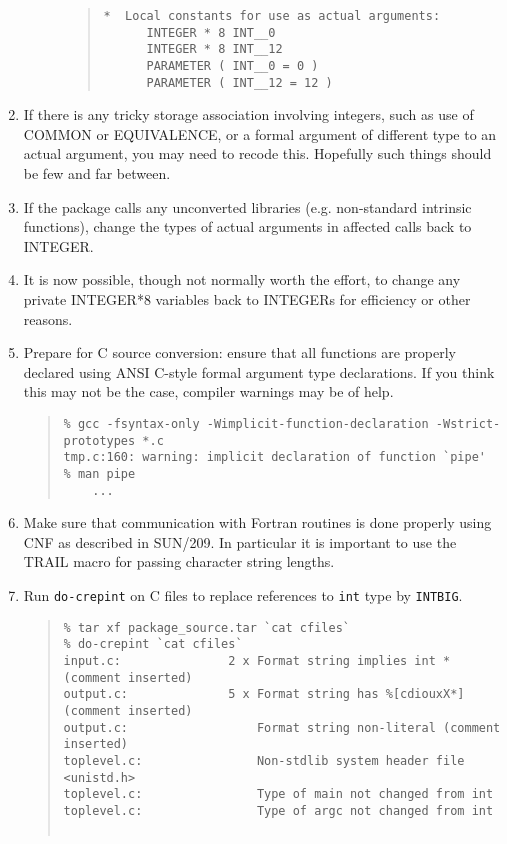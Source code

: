 \documentclass[twoside,11pt]{article}
\newcommand{\htmlref}[2]{#1}
\newcommand{\html}[1]{}
\newcommand{\xref}[3]{#1}
\renewcommand{\_}{\texttt{\symbol{95}}}
\newcommand{\xdofilter}[1]{\htmlref{{\tt do-#1}}{do-xxx}}
\newcommand{\cc}[1]{{\tt #1}}
\newenvironment{squote}{\begin{quote}\begin{small}}{\end{small}\end{quote}}
\begin{document}
\begin{enumerate}
\begin{description}
\begin{squote}
\begin{verbatim}
*  Local constants for use as actual arguments:
      INTEGER * 8 INT__0
      INTEGER * 8 INT__12
      PARAMETER ( INT__0 = 0 )
      PARAMETER ( INT__12 = 12 )
\end{verbatim}
\end{squote}
%
\end{description}
%
\item
If there is any tricky storage association involving integers,
such as use of COMMON or EQUIVALENCE, or a formal argument of
different type to an actual argument, you may need to recode this.
Hopefully such things should be few and far between.
\html{\begin{squote}\end{squote}}
%
\item
If the package calls any unconverted libraries 
(e.g. non-standard intrinsic functions), change the types of
actual arguments in affected calls back to INTEGER.
\html{\begin{squote}\end{squote}}
%
\item
It is now possible, though not normally worth the effort, 
to change any private INTEGER*8 variables back to INTEGERs 
for efficiency or other reasons.
\html{\begin{squote}\end{squote}}
%
\item
Prepare for C source conversion: ensure that all functions are
properly declared using ANSI C-style formal argument type declarations.
If you think this may not be the case, compiler warnings may be of help.
\begin{squote}
\begin{verbatim}
% gcc -fsyntax-only -Wimplicit-function-declaration -Wstrict-prototypes *.c
tmp.c:160: warning: implicit declaration of function `pipe'
% man pipe
    ...
\end{verbatim}
\end{squote}
%
\item
Make sure that communication with Fortran routines is done properly
using CNF as described in \xref{SUN/209}{sun209}{}.
In particular it is important to use the \xref{TRAIL}{sun209}{TRAIL} 
macro for passing character string lengths.
\html{\begin{squote}\end{squote}}
%
\item
Run \xdofilter{crepint} on C files to replace references to \cc{int} type
by \cc{INT\_BIG}.
\begin{squote}
\begin{verbatim}
% tar xf package_source.tar `cat cfiles`
% do-crepint `cat cfiles`
input.c:               2 x Format string implies int * (comment inserted)
output.c:              5 x Format string has %[cdiouxX*] (comment inserted)  
output.c:                  Format string non-literal (comment inserted)
toplevel.c:                Non-stdlib system header file <unistd.h>    
toplevel.c:                Type of main not changed from int
toplevel.c:                Type of argc not changed from int


\end{verbatim}
\end{squote}
\end{enumerate}
\end{document}
